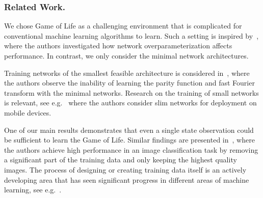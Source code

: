 \documentclass[letterpaper]{article} %
\begin{document}
\subsubsection{Related Work.}
We chose Game of Life as a challenging environment that is complicated for conventional machine learning algorithms to learn.
Such a setting is inspired by~\cite{springer2021s}, where the authors investigated how network overparameterization affects performance.
In contrast, we only consider the minimal network architectures.

Training networks of the smallest feasible architecture is considered in~\cite{nye2018efficient}, where the authors observe the inability of learning the parity function and fast Fourier transform with the minimal networks.
Research on the training of small networks is relevant, see e.g.~\cite{winoto2020small} where the authors consider slim networks for deployment on mobile devices.


One of our main results demonstrates that even a single state observation could be sufficient to learn the Game of Life.
Similar findings are presented in~\cite{motamedi2021data}, where the authors achieve high performance in an image classification task by removing a significant part of the training data and only keeping the highest quality images.
The process of designing or creating training data itself is an actively developing area that has seen significant progress in different areas of machine learning, see e.g.~\cite{ratner2016data, abufadda2021survey}.
\end{document}
